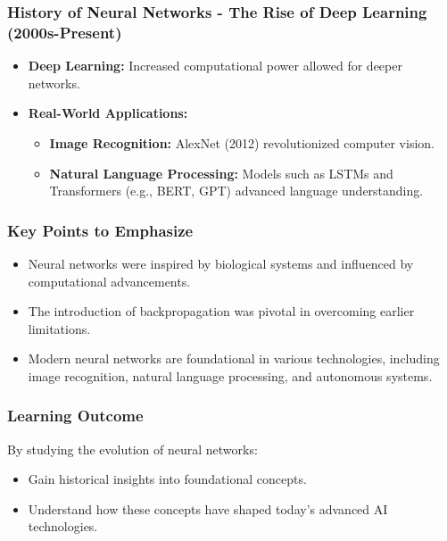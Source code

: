 \documentclass[aspectratio=169]{beamer}
\begin{document}
\begin{frame}[fragile]
    \frametitle{History of Neural Networks - The Rise of Deep Learning (2000s-Present)}
    \begin{itemize}
        \item \textbf{Deep Learning:} Increased computational power allowed for deeper networks.
        \item \textbf{Real-World Applications:}
            \begin{itemize}
                \item \textbf{Image Recognition:} AlexNet (2012) revolutionized computer vision.
                \item \textbf{Natural Language Processing:} Models such as LSTMs and Transformers (e.g., BERT, GPT) advanced language understanding.
            \end{itemize}
    \end{itemize}
\end{frame}

\begin{frame}[fragile]
    \frametitle{Key Points to Emphasize}
    \begin{itemize}
        \item Neural networks were inspired by biological systems and influenced by computational advancements.
        \item The introduction of backpropagation was pivotal in overcoming earlier limitations.
        \item Modern neural networks are foundational in various technologies, including image recognition, natural language processing, and autonomous systems.
    \end{itemize}
\end{frame}

\begin{frame}[fragile]
    \frametitle{Learning Outcome}
    By studying the evolution of neural networks:
    \begin{itemize}
        \item Gain historical insights into foundational concepts.
        \item Understand how these concepts have shaped today's advanced AI technologies.
    \end{itemize}
\end{frame}
\end{document}
